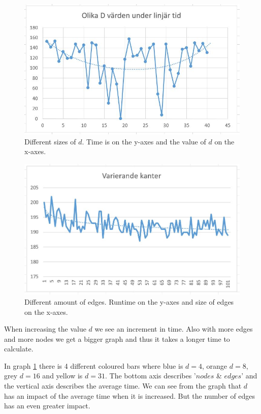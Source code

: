 \documentclass[paper=a4, fontsize=11pt]{scrartcl}
\numberwithin{equation}{section}		%
\numberwithin{figure}{section}			%
\numberwithin{table}{section}				%
\begin{document}
\begin{figure}
  \includegraphics[width=\linewidth]{Average_of_diffrent_d_values.jpg}
  \caption{Different sizes of $d$. Time is on the y-axes and the value of $d$ on the x-axes.}
  \label{fig:result}
\end{figure}

\begin{figure}
  \includegraphics[width=\linewidth]{varierande_kanter.jpg}
  \caption{Different amount of edges. Runtime on the y-axes and size of edges on the x-axes.}
  \label{fig:result2}
\end{figure}

When increasing the value $d$ we see an increment in time.
Also with more edges and more nodes we get a bigger graph and thus it takes a longer time to calculate.

In graph \ref{fig:result} there is 4 different coloured bars where blue is $d=4$, orange $d=8$, grey $d=16$ and yellow is $d=31$. The bottom axis describes '$nodes$ \& $edges$' and the vertical axis describes the average time. We can see from the graph that $d$ has an impact of the average time when it is increased. But the number of edges has an even greater impact.
\end{document}
